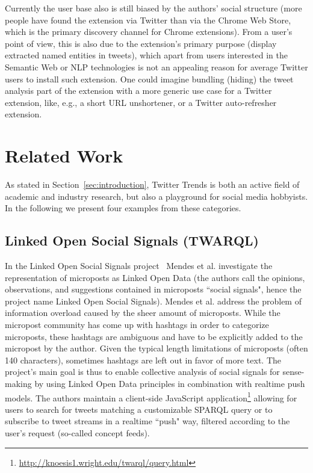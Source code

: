 \documentclass[runningheads,a4paper]{llncs}
\begin{document}
Currently the user base also is still biased by the authors' social structure (more people have found the extension via Twitter than via the Chrome Web Store, which is the primary discovery channel for Chrome extensions). From a user's point of view, this is also due to the extension's primary purpose (display extracted named entities in tweets), which apart from users interested in the Semantic Web or NLP technologies is not an appealing reason for average Twitter users to install such extension. One could imagine bundling (hiding) the tweet analysis part of the extension with a more generic use case for a Twitter extension, like, e.g., a short URL unshortener, or a Twitter auto-refresher extension.

\section{Related Work}\label{sec:relatedwork}
As stated in Section~\ref{sec:introduction}, Twitter Trends is both an active field of academic and industry research, but also a playground for social media hobbyists. In the following we present four examples from these categories.

\subsection{Linked Open Social Signals (TWARQL)}
In the Linked Open Social Signals project~\cite{Mendes:LOSS} Mendes et al. investigate the representation of microposts as Linked Open Data (the authors call the opinions, observations, and suggestions contained in microposts ``social signals", hence the project name Linked Open Social Signals). Mendes et al. address the problem of information overload caused by the sheer amount of microposts. While the micropost community has come up with hashtags in order to categorize microposts, these hashtags are ambiguous and have to be explicitly added to the micropost by the author. Given the typical length limitations of microposts (often 140 characters), sometimes hashtags are left out in favor of more text. The project's main goal is thus to enable collective analysis of social signals for sense-making by using Linked Open Data principles in combination with realtime push models. The authors maintain a client-side JavaScript application\footnote{\url{http://knoesis1.wright.edu/twarql/query.html}} allowing for users to search for tweets matching a customizable SPARQL query or to subscribe to tweet streams in a realtime ``push" way, filtered according to the user's request (so-called concept feeds).
\end{document}
